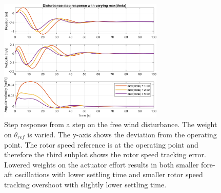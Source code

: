 \begin{figure}[ht]
	\centering
	\includegraphics[width=0.7\textwidth]{Graphics/LQI pole zero/105_step_theta.png}
	\caption{Step response from a step on the free wind disturbance. The weight on $ \theta_{ref} $ is varied. The y-axis shows the deviation from the operating point. The rotor speed reference is at the operating point and therefore the third subplot shows the rotor speed tracking error. Lowered weights on the actuator effort results in both smaller fore-aft oscillations with lower settling time and smaller rotor speed tracking overshoot with slightly lower settling time.}
	\label{fig:step_theta}
\end{figure}


%	
%	
